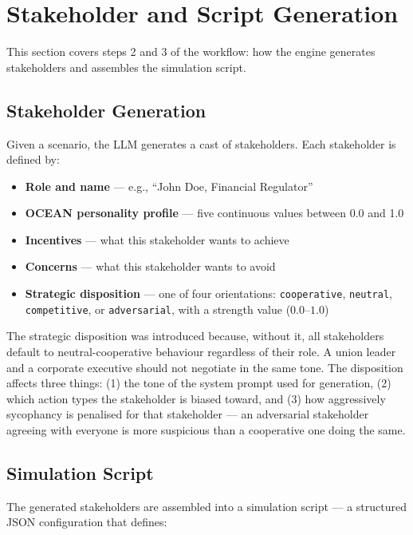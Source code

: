 \documentclass[12pt, a4paper]{report}
\begin{document}
\section{Stakeholder and Script Generation}

This section covers steps 2 and 3 of the workflow: how the engine generates stakeholders and assembles the simulation script.

\subsection{Stakeholder Generation}

Given a scenario, the LLM generates a cast of stakeholders. Each stakeholder is defined by:

\begin{itemize}[leftmargin=*, itemsep=1pt]
    \item \textbf{Role and name} --- e.g., ``John Doe, Financial Regulator''
    \item \textbf{OCEAN personality profile} --- five continuous values between 0.0 and 1.0
    \item \textbf{Incentives} --- what this stakeholder wants to achieve
    \item \textbf{Concerns} --- what this stakeholder wants to avoid
    \item \textbf{Strategic disposition} --- one of four orientations: \texttt{cooperative}, \texttt{neutral}, \texttt{competitive}, or \texttt{adversarial}, with a strength value ($0.0$--$1.0$)
\end{itemize}

The strategic disposition was introduced because, without it, all stakeholders default to neutral-cooperative behaviour regardless of their role. A union leader and a corporate executive should not negotiate in the same tone. The disposition affects three things: (1) the tone of the system prompt used for generation, (2) which action types the stakeholder is biased toward, and (3) how aggressively sycophancy is penalised for that stakeholder --- an adversarial stakeholder agreeing with everyone is more suspicious than a cooperative one doing the same.

\subsection{Simulation Script}

The generated stakeholders are assembled into a simulation script --- a structured JSON configuration that defines:
\end{document}
